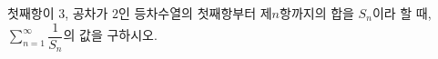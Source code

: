 첫째항이 $3$, 공차가 $2$인 등차수열의 첫째항부터 제$n$항까지의 합을 $S_n$이라 할 때, $\displaystyle\sum_{n=1}^{\infty}\dfrac{1}{S_n}$의 값을 구하시오.
